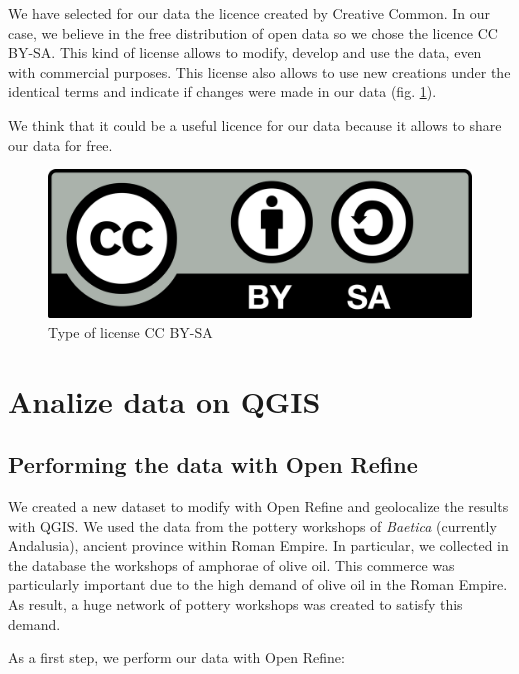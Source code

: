 \documentclass[10pt,a4paper]{article}
\begin{document}
We have selected for our data the licence created by Creative Common. In our case, we believe in the free distribution of open data so we chose the licence CC BY-SA. This kind of license allows to modify, develop and use the data, even with commercial purposes. This license also allows to use new creations under the identical terms and indicate if changes were made in our data (fig. \ref{licence}).

We think that it could be a useful licence for our data because it allows to share our data for free. 
\\
\begin{figure}[htp]
\centering
\includegraphics[scale=0.15]{licence.png}
\caption{Type of license CC BY-SA}
\label{licence}
\end{figure}


\section{Analize data on QGIS}

\subsection{Performing the data with Open Refine}

We created a new dataset to modify with Open Refine and geolocalize the results with QGIS. We used the data from the pottery workshops of \emph{Baetica} (currently Andalusia), ancient province within Roman Empire. In particular, we collected in the database the workshops of amphorae of olive oil. This commerce was particularly important due to the high demand of olive oil in the Roman Empire. As result, a huge network of pottery workshops was created to satisfy this demand. 

\newpage
As a first step, we perform our data with Open Refine:
\end{document}
